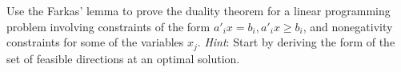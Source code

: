 Use the Farkas' lemma to prove the duality theorem for a linear programming problem involving constraints of the form $a'_ix = b_i, a'_ix \geq b_i$, and nonegativity constraints for some of the variables $x_j$. \emph{Hint}: Start by deriving the form of the set of feasible directions at an optimal solution.
